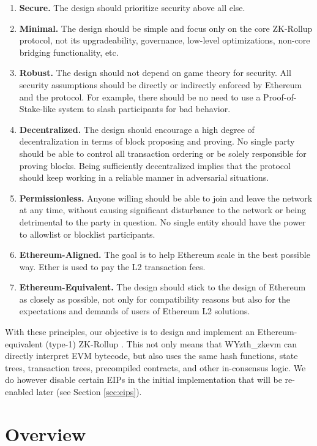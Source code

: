 \documentclass[9pt,oneside]{amsart}
\begin{document}
\begin{multicols}{2}
\begin{enumerate}
\item \textbf{Secure.} The design should prioritize security above all else.
\item \textbf{Minimal.} The design should be simple and focus only on the core ZK-Rollup protocol, not its upgradeability, governance, low-level optimizations, non-core bridging functionality, etc.
\item  \textbf{Robust.} The design should not depend on game theory for security. All security assumptions should be directly or indirectly enforced by Ethereum and the protocol. For example, there should be no need to use a Proof-of-Stake-like system to slash participants for bad behavior.
\item \textbf{Decentralized.} The design should encourage a high degree of decentralization in terms of block proposing and proving. No single party should be able to control all transaction ordering or be solely responsible for proving blocks. Being sufficiently decentralized implies that the protocol should keep working in a reliable manner in adversarial situations.
\item \textbf{Permissionless.} Anyone willing should be able to join and leave the network at any time, without causing significant disturbance to the network or being detrimental to the party in question. No single entity should have the power to allowlist or blocklist participants.
\item \textbf{Ethereum-Aligned.} The goal is to help Ethereum scale in the best possible way. Ether is used to pay the L2 transaction fees.
\item \textbf{Ethereum-Equivalent.} The design should stick to the design of Ethereum as closely as possible, not only for compatibility reasons but also for the expectations and demands of users of Ethereum L2 solutions.
\end{enumerate}

With these principles, our objective is to design and implement an Ethereum-equivalent (type-1) ZK-Rollup \cite{vitalik-zkevm}. This not only means that WYzth_zkevm can directly interpret EVM bytecode, but also uses the same hash functions, state trees, transaction trees, precompiled contracts, and other in-consensus logic. We do however disable certain EIPs in the initial implementation\cite{wyzth_zkevmprotogithub} that will be re-enabled later (see Section \ref{sec:eips}).

\section{Overview}\label{sec:properties}


\end{multicols}
\end{document}
